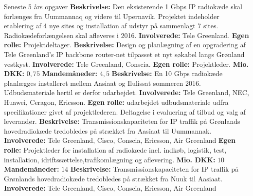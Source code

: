 \begin{rubric}{Seneste 5 års opgaver}
%
 \textbf{Beskrivelse:} Den eksisterende 1 Gbps IP radiokæde skal forlænges fra Uummannaq og videre til Upernavik. Projektet indeholder etablering af 4 nye sites og installation af udstyr på sammenlagt 7 sites. Radiokædeforlængelsen skal afleveres i 2016.
\entry* \textbf{Involverede:} Tele Greenland.
\entry* \textbf{Egen rolle:} Projektdeltager.
%
 \textbf{Beskrivelse:} Design og planlægning af en opgradering af Tele Greenland's IP backbone router-net tilpasset et nyt søkabel langs Grønland vestkyst.
\entry* \textbf{Involverede:} Tele Greenland, Conscia.
\entry* \textbf{Egen rolle:} Projektleder.
\entry* \textbf{Mio. DKK:} $0,75$
\entry* \textbf{Mandemåneder:} $4,5$
%
 \textbf{Beskrivelse:} En 10 Gbps radiokæde planlægges installeret mellem Aasiaat og Ilulissat sommeren 2016. Udbudsmateriale hertil er derfor udarbejdet.
\entry* \textbf{Involverede:} Tele Greenland, NEC, Huawei, Ceragon, Ericsson.
\entry* \textbf{Egen rolle:} udarbejdet udbudsmateriale udfra specifikationer givet af projektlederen. Deltagelse i evaluering af tilbud og valg af leverandør.
%
%
 \textbf{Beskrivelse:} Transmissionskapaciteten for IP traffik på Grønlands hovedradiokæde tredobledes på strækket fra Aasiaat til Uummannak.
\entry* \textbf{Involverede:} Tele Greenland, Cisco, Conscia, Ericsson, Air Greenland
\entry* \textbf{Egen rolle:} Projektleder for installation af radiokæde incl. indkøb, logistik, test, installation, idriftssættelse,trafikomlægning og aflevering.
\entry* \textbf{Mio. DKK:} $10$
\entry* \textbf{Mandemåneder:} $14$
%
 \textbf{Beskrivelse:} Transmissionskapaciteten for IP traffik på Grønlands hovedradiokæde tredobledes på strækket fra Nuuk til Aasiaat.
\entry* \textbf{Involverede:} Tele Greenland, Cisco, Conscia, Ericsson, Air Greenland

\end{rubric}
